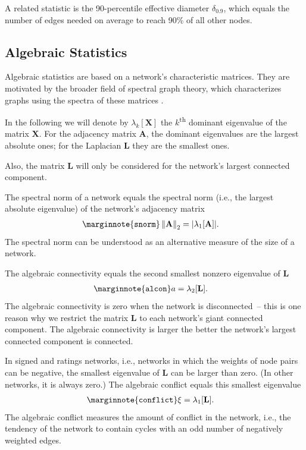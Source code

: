 \documentclass{article}
\begin{document}
A related statistic is the 90-percentile effective diameter
$\delta_{0.9}$, which equals the number of edges needed on average to
reach 90\% of all other nodes.

\subsection{Algebraic Statistics}

Algebraic statistics are based on a network's characteristic matrices.
They are motivated by the broader field of spectral graph theory, which
characterizes graphs using the spectra of these matrices \citep{b285}.

In the following we will denote by $\lambda_k[\mathbf X]$ the
$k$\textsuperscript{th} dominant eigenvalue of the matrix $\mathbf X$.
For the adjacency matrix $\mathbf A$, the dominant eigenvalues are the
largest absolute ones; for the Laplacian $\mathbf L$ they are the
smallest ones.

Also, the matrix $\mathbf L$ will only be considered for the network's
largest connected component.

The spectral norm of a network equals the spectral norm (i.e., the
largest absolute eigenvalue) of the network's adjacency matrix
\begin{align}
  \marginnote{\texttt{snorm}} 
  \left\| \mathbf A \right\|_2
  &= 
  | \lambda_1[\mathbf A] | .
\end{align}
The spectral norm can be understood as an alternative measure of the
size of a network.

The algebraic connectivity equals the second smallest nonzero eigenvalue
of $\mathbf L$ \citep{b652}
\begin{align}
  \marginnote{\texttt{alcon}} a &= \lambda_2[\mathbf L].
\end{align}
The algebraic connectivity is zero when the network is disconnected~--
this is one reason why we restrict the matrix $\mathbf L$ to each
network's giant connected component.  The algebraic connectivity is
larger the better the network's largest connected component is
connected.

In signed and ratings networks, i.e., networks in which the weights of
node pairs can be negative, the smallest eigenvalue of $\mathbf L$ can
be larger than zero.  (In other networks, it is always zero.) The
algebraic conflict equals this smallest eigenvalue
\begin{align}
  \marginnote{\texttt{conflict}} \xi &= \lambda_1[\mathbf L].
\end{align}
The algebraic conflict measures the amount of conflict in the network,
i.e., the tendency of the network to contain cycles with an odd number
of negatively weighted edges.
\end{document}

